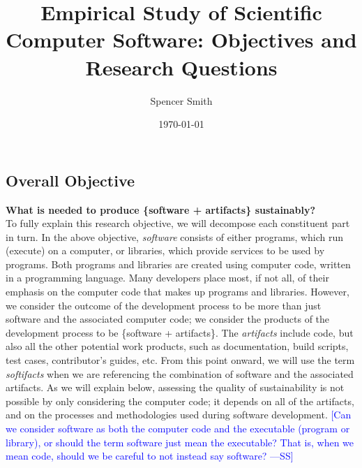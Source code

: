 \documentclass[12pt]{article}
\newcommand{\authornote}[3]{\textcolor{#1}{[#3 ---#2]}}
\newcommand{\authornote}[3]{}
\newcommand{\wss}[1]{\authornote{blue}{SS}{#1}} %
\begin{document}
\title{Empirical Study of Scientific Computer Software: Objectives and Research Questions} 
\author{Spencer Smith}
\date{\today}
	

\subsection* {Overall Objective}

\textbf{What is needed to produce \{software + artifacts\} sustainably?}\\

To fully explain this research objective, we will decompose each constituent
part in turn.  In the above objective, \emph{software} consists of either
programs, which run (execute) on a computer, or libraries, which provide
services to be used by programs.  Both programs and libraries are created using
computer code, written in a programming language.  Many developers place most,
if not all, of their emphasis on the computer code that makes up programs and
libraries.  However, we consider the outcome of the development process to be
more than just software and the associated computer code; we consider the
products of the development process to be \{software + artifacts\}.  The
\emph{artifacts} include code, but also all the other potential work products,
such as documentation, build scripts, test cases, contributor's guides, etc.
From this point onward, we will use the term \emph{softifacts} when we are
referencing the combination of software and the associated artifacts.  As we
will explain below, assessing the quality of sustainability is not possible by
only considering the computer code; it depends on all of the artifacts, and on
the processes and methodologies used during software development.  \wss{Can we
  consider software as both the computer code and the executable (program or
  library), or should the term software just mean the executable?  That is, when
  we mean code, should we be careful to not instead say software?}
\end{document}
